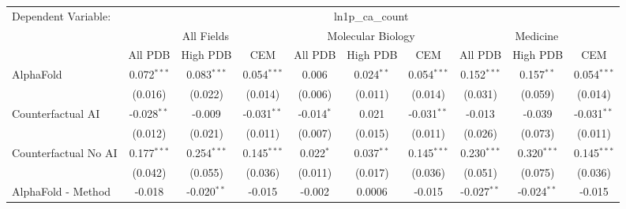 \begingroup
\centering
\begin{tabular}{lccccccccc}
   \tabularnewline \midrule \midrule
   Dependent Variable: & \multicolumn{9}{c}{ln1p\_ca\_count}\\
 & \multicolumn{3}{c}{All Fields} & \multicolumn{3}{c}{Molecular Biology} & \multicolumn{3}{c}{Medicine} \\
\cmidrule(lr){2-7} \cmidrule(lr){5-10} \cmidrule(lr){8-7}
 & \multicolumn{1}{c}{All PDB} & \multicolumn{1}{c}{High PDB} & \multicolumn{1}{c}{CEM} & \multicolumn{1}{c}{All PDB} & \multicolumn{1}{c}{High PDB} & \multicolumn{1}{c}{CEM} & \multicolumn{1}{c}{All PDB} & \multicolumn{1}{c}{High PDB} & \multicolumn{1}{c}{CEM} \\
\cmidrule(lr){2-3} \cmidrule(lr){3-4} \cmidrule(lr){4-5} \cmidrule(lr){5-6} \cmidrule(lr){6-7} \cmidrule(lr){7-8} \cmidrule(lr){8-9} \cmidrule(lr){9-10} \cmidrule(lr){10-3}
   AlphaFold                                                   & 0.072$^{***}$  & 0.083$^{***}$  & 0.054$^{***}$  & 0.006          & 0.024$^{**}$  & 0.054$^{***}$  & 0.152$^{***}$  & 0.157$^{**}$  & 0.054$^{***}$\\   
                                                               & (0.016)        & (0.022)        & (0.014)        & (0.006)        & (0.011)       & (0.014)        & (0.031)        & (0.059)       & (0.014)\\   
   Counterfactual AI                                           & -0.028$^{**}$  & -0.009         & -0.031$^{**}$  & -0.014$^{*}$   & 0.021         & -0.031$^{**}$  & -0.013         & -0.039        & -0.031$^{**}$\\   
                                                               & (0.012)        & (0.021)        & (0.011)        & (0.007)        & (0.015)       & (0.011)        & (0.026)        & (0.073)       & (0.011)\\   
   Counterfactual No AI                                        & 0.177$^{***}$  & 0.254$^{***}$  & 0.145$^{***}$  & 0.022$^{*}$    & 0.037$^{**}$  & 0.145$^{***}$  & 0.230$^{***}$  & 0.320$^{***}$ & 0.145$^{***}$\\   
                                                               & (0.042)        & (0.055)        & (0.036)        & (0.011)        & (0.017)       & (0.036)        & (0.051)        & (0.075)       & (0.036)\\   
   AlphaFold - Method                                          & -0.018         & -0.020$^{**}$  & -0.015         & -0.002         & 0.0006        & -0.015         & -0.027$^{**}$  & -0.024$^{**}$ & -0.015\\   

\end{tabular}
